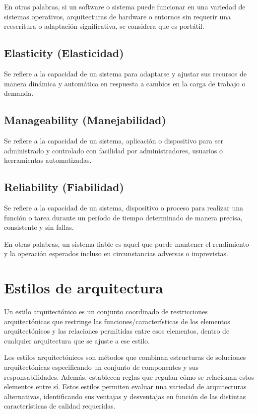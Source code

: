 \documentclass{article}
\begin{document}
		En otras palabras, si un software o sistema puede funcionar en una variedad de sistemas operativos, arquitecturas de hardware o entornos sin requerir una reescritura o adaptación significativa, se considera que es portátil.
		
		\subsection{Elasticity \small{(Elasticidad)}}
		Se refiere a la capacidad de un sistema para adaptarse y ajustar sus recursos de manera dinámica y automática en respuesta a cambios en la carga de trabajo o demanda.
		
		\subsection{Manageability  \small{(Manejabilidad)}}
		Se refiere a la capacidad de un sistema, aplicación o dispositivo para ser administrado y controlado con facilidad por administradores, usuarios o herramientas automatizadas.
		
		\subsection{Reliability  \small{(Fiabilidad)}}
		Se refiere a la capacidad de un sistema, dispositivo o proceso para realizar una función o tarea durante un período de tiempo determinado de manera precisa, consistente y sin fallas.
		
		En otras palabras, un sistema fiable es aquel que puede mantener el rendimiento y la operación esperados incluso en circunstancias adversas o imprevistas.
		
		
		
		\section{Estilos de arquitectura}
		Un estilo arquitectónico es un conjunto coordinado de restricciones arquitectónicas que restringe las
		funciones/características de los elementos arquitectónicos y las relaciones permitidas entre esos elementos, dentro de cualquier arquitectura que se ajuste a ese estilo.
		
		Los estilos arquitectónicos son métodos que combinan estructuras de soluciones arquitectónicas especificando un conjunto de componentes y sus responsabilidades. Además, establecen reglas que regulan cómo se relacionan estos elementos entre sí. Estos estilos permiten evaluar una variedad de arquitecturas alternativas, identificando sus ventajas y desventajas en función de las distintas características de calidad requeridas.
		
\end{document}
